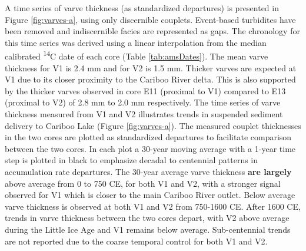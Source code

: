 \documentclass[Royal,times,doublespace,sageh]{sagej}
\begin{document}
A time series of varve thickness (as standardized departures) is
presented in Figure \ref{fig:varves-a}, using only discernible couplets.
Event-based turbidites have been removed and indiscernible facies are
represented as gaps. The chronology for this time series was derived
using a linear interpolation from the median calibrated
\textsuperscript{14}C date of each core (Table \ref{tab:amsDates}). The
mean varve thickness for V1 is 2.4 mm and for V2 is 1.5 mm. Thicker
varves are expected at V1 due to its closer proximity to the Cariboo
River delta. This is also supported by the thicker varves observed in
core E11 (proximal to V1) compared to E13 (proximal to V2) of 2.8 mm to
2.0 mm respectively. The time series of varve thickness measured from V1
and V2 illustrates trends in suspended sediment delivery to Cariboo Lake
(Figure \ref{fig:varves-a}). The measured couplet thicknesses in the two
cores are plotted as standardized departures to facilitate comparison
between the two cores. In each plot a 30-year moving average with a
1-year time step is plotted in black to emphasize decadal to centennial
patterns in accumulation rate departures. The 30-year average varve
thickness \textbf{are largely} above average from 0 to 750 CE, for both
V1 and V2, with a stronger signal observed for V1 which is closer to the
main Cariboo River outlet. Below average varve thickness is observed at
both V1 and V2 from 750-1600 CE. After 1600 CE, trends in varve
thickness between the two cores depart, with V2 above average during the
Little Ice Age and V1 remains below average. Sub-centennial trends are
not reported due to the coarse temporal control for both V1 and V2.
\end{document}
